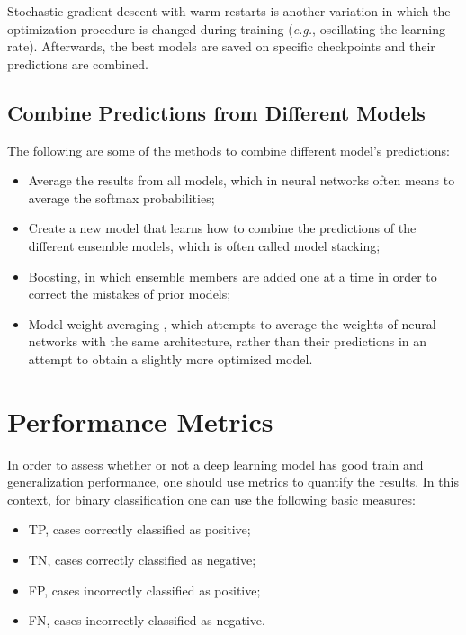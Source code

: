     Stochastic gradient descent with warm restarts \cite{sgdr} is another variation in which the optimization procedure is changed during training (\textit{e.g.}, oscillating the learning rate). Afterwards, the best models are saved on specific checkpoints and their predictions are combined. \par
    
\subsection{Combine Predictions from Different Models}
    The following are some of the methods to combine different model's predictions:
    \begin{itemize}
        \item Average the results from all models, which in neural networks often means to average the softmax probabilities;
        \item Create a new model that learns how to combine the predictions of the different ensemble models, which is often called model stacking;
        \item Boosting, in which ensemble members are added one at a time in order to correct the mistakes of prior models;
        \item Model weight averaging \cite{Izmailov2018}, which attempts to average the weights of neural networks with the same architecture, rather than their predictions in an attempt to obtain a slightly more optimized model.
    \end{itemize}

\section{Performance Metrics}
\label{section:metrics}
    In order to assess whether or not a deep learning model has good train and generalization performance, one should use metrics to quantify the results. In this context, for binary classification one can use the following basic measures:
    \begin{itemize}
        \item \ac{TP}, cases correctly classified as positive;
        \item \ac{TN}, cases correctly classified as negative;
        \item \ac{FP}, cases incorrectly classified as positive;
        \item \ac{FN}, cases incorrectly classified as negative.
    \end{itemize}
    
